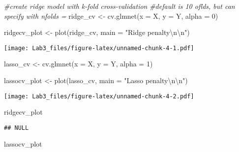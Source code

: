 \documentclass[
]{article}
\newenvironment{Shaded}{\begin{snugshade}}{\end{snugshade}}
\newcommand{\AttributeTok}[1]{\textcolor[rgb]{0.77,0.63,0.00}{#1}}
\newcommand{\CommentTok}[1]{\textcolor[rgb]{0.56,0.35,0.01}{\textit{#1}}}
\newcommand{\DecValTok}[1]{\textcolor[rgb]{0.00,0.00,0.81}{#1}}
\newcommand{\FunctionTok}[1]{\textcolor[rgb]{0.00,0.00,0.00}{#1}}
\newcommand{\NormalTok}[1]{#1}
\newcommand{\OtherTok}[1]{\textcolor[rgb]{0.56,0.35,0.01}{#1}}
\newcommand{\SpecialCharTok}[1]{\textcolor[rgb]{0.00,0.00,0.00}{#1}}
\newcommand{\StringTok}[1]{\textcolor[rgb]{0.31,0.60,0.02}{#1}}
\begin{document}
\begin{Shaded}
\begin{Highlighting}[]
\CommentTok{\#create ridge model with k{-}fold cross{-}validation}
\CommentTok{\#default is 10 oflds, but can specify with nfolds =}
\NormalTok{ridge\_cv }\OtherTok{\textless{}{-}} \FunctionTok{cv.glmnet}\NormalTok{(}\AttributeTok{x =}\NormalTok{ X,}
                      \AttributeTok{y =}\NormalTok{ Y,}
                      \AttributeTok{alpha =} \DecValTok{0}\NormalTok{)}
                      

\NormalTok{ridgecv\_plot }\OtherTok{\textless{}{-}} \FunctionTok{plot}\NormalTok{(ridge\_cv, }
                     \AttributeTok{main =} \StringTok{"Ridge penalty}\SpecialCharTok{\textbackslash{}n\textbackslash{}n}\StringTok{"}\NormalTok{)}
\end{Highlighting}
\end{Shaded}

\texttt{[image: Lab3\_files/figure-latex/unnamed-chunk-4-1.pdf]}

\begin{Shaded}
\begin{Highlighting}[]
\NormalTok{lasso\_cv }\OtherTok{\textless{}{-}} \FunctionTok{cv.glmnet}\NormalTok{(}\AttributeTok{x =}\NormalTok{ X,}
                       \AttributeTok{y =}\NormalTok{ Y,}
                       \AttributeTok{alpha =} \DecValTok{1}\NormalTok{)}

\NormalTok{lassocv\_plot }\OtherTok{\textless{}{-}} \FunctionTok{plot}\NormalTok{(lasso\_cv, }\AttributeTok{main =} \StringTok{"Lasso penalty}\SpecialCharTok{\textbackslash{}n\textbackslash{}n}\StringTok{"}\NormalTok{) }
\end{Highlighting}
\end{Shaded}

\texttt{[image: Lab3\_files/figure-latex/unnamed-chunk-4-2.pdf]}

\begin{Shaded}
\begin{Highlighting}[]
\NormalTok{ ridgecv\_plot }
\end{Highlighting}
\end{Shaded}

\begin{verbatim}
## NULL
\end{verbatim}

\begin{Shaded}
\begin{Highlighting}[]
\NormalTok{ lassocv\_plot}
\end{Highlighting}
\end{Shaded}
\end{document}
